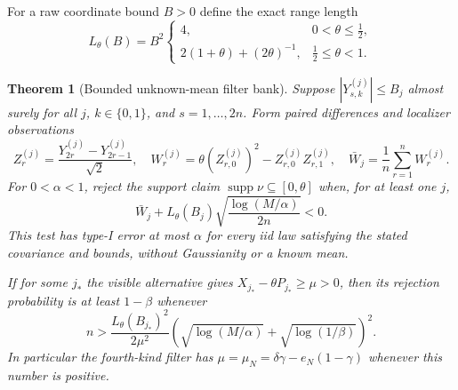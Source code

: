 \documentclass[11pt]{article}
\newtheorem{theorem}{Theorem}[section]
\theoremstyle{definition}
\theoremstyle{remark}
\newcommand{\supp}{\operatorname{supp}}
\begin{document}
For a raw coordinate bound $B>0$ define the exact range length
\begin{equation}
 L_\theta(B)=B^2
 \begin{cases}
 4, & 0<\theta\leq\tfrac12,\\[1mm]
 2(1+\theta)+(2\theta)^{-1}, & \tfrac12\leq\theta<1.
 \end{cases}                                           \label{eq:Ltheta}
\end{equation}

\begin{theorem}[Bounded unknown-mean filter bank]       \label{thm:bounded}
Suppose $|Y_{s,k}^{(j)}|\leq B_j$ almost surely for all $j$, $k\in\{0,1\}$,
and $s=1,\ldots,2n$.  Form paired differences and localizer observations
\begin{equation}
 Z_r^{(j)}=\frac{Y_{2r}^{(j)}-Y_{2r-1}^{(j)}}{\sqrt2},
 \quad
 W_r^{(j)}=\theta(Z_{r,0}^{(j)})^2-Z_{r,0}^{(j)}Z_{r,1}^{(j)},
 \quad
 \bar W_j=\frac1n\sum_{r=1}^nW_r^{(j)}.               \label{eq:pairedstat}
\end{equation}
For $0<\alpha<1$, reject the support claim
$\supp\nu\subseteq[0,\theta]$ when, for at least one $j$,
\begin{equation}
 \bar W_j+L_\theta(B_j)
 \sqrt{\frac{\log(M/\alpha)}{2n}}<0.                 \label{eq:boundedtest}
\end{equation}
This test has type-I error at most $\alpha$ for every iid law satisfying the
stated covariance and bounds, without Gaussianity or a known mean.

If for some $j_*$ the visible alternative gives
$X_{j_*}-\theta P_{j_*}\geq\mu>0$, then its rejection probability is at least
$1-\beta$ whenever
\begin{equation}
 n>
 \frac{L_\theta(B_{j_*})^2}{2\mu^2}
 \left(\sqrt{\log(M/\alpha)}+
       \sqrt{\log(1/\beta)}\right)^2.                 \label{eq:boundedsample}
\end{equation}
In particular the fourth-kind filter has
$\mu=\mu_N=\delta\gamma-e_N(1-\gamma)$ whenever this number is positive.
\end{theorem}
\end{document}
